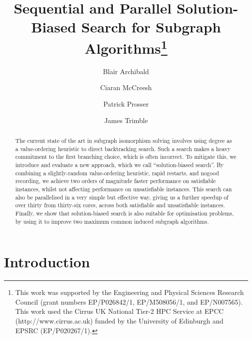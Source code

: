 \documentclass[runningheads]{llncs}
\begin{document}
\title{Sequential and Parallel Solution-Biased Search for Subgraph Algorithms\thanks{This work was
supported by the Engineering and Physical Sciences Research Council (grant numbers EP/P026842/1,
EP/M508056/1, and EP/N007565). This work used the Cirrus UK National Tier-2 HPC Service at EPCC
(http://www.cirrus.ac.uk) funded by the University of Edinburgh and EPSRC (EP/P020267/1).}}

\author{Blair Archibald\and
Ciaran McCreesh\and
Patrick Prosser \and
James Trimble}



\maketitle

\begin{abstract}
    The current state of the art in subgraph isomorphism solving involves using degree as a
    value-ordering heuristic to direct backtracking search. Such a search makes a heavy commitment
    to the first branching choice, which is often incorrect. To mitigate this, we introduce and
    evaluate a new approach, which we call ``solution-biased search''. By combining a
    slightly-random value-ordering heuristic, rapid restarts, and nogood recording, we achieve two
    orders of magnitude faster performance on satisfiable instances, whilst not affecting
    performance on unsatisfiable instances. This search can also be parallelised in a very simple
    but effective way, giving us a further speedup of over thirty from thirty-six cores, across both
    satisfiable and unsatisfiable instances.  Finally, we show that solution-biased search is also
    suitable for optimisation problems, by using it to improve two maximum common induced subgraph
    algorithms.
\end{abstract}

\section{Introduction}
\end{document}
